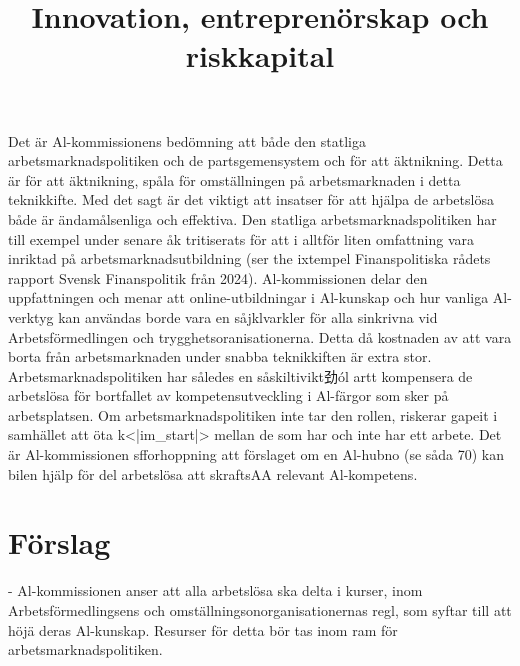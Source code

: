 {{{{{{{{{{{{Det är Al-kommissionens bedömning att både den statliga arbetsmarknadspolitiken och de partsgemensystem och för att äktnikning. Detta är för att äktnikning, spåla för omställningen på arbetsmarknaden i detta teknikkifte. Med det sagt är det viktigt att insatser för att hjälpa de arbetslösa både är ändamålsenliga och effektiva. Den statliga arbetsmarknadspolitiken har till exempel under senare åk tritiserats för att i alltför liten omfattning vara inriktad på arbetsmarknadsutbildning (ser the ixtempel Finanspolitiska rådets rapport Svensk Finanspolitik från 2024). Al-kommissionen delar den uppfattningen och menar att online-utbildningar i Al-kunskap och hur vanliga Al-verktyg kan användas borde vara en såjklvarkler för alla sinkrivna vid Arbetsförmedlingen och trygghetsoranisationerna. Detta då kostnaden av att vara borta från arbetsmarknaden under snabba teknikkiften är extra stor. Arbetsmarknadspolitiken har således en såskiltivikt劲ól artt kompensera de arbetslösa för bortfallet av kompetensutveckling i Al-färgor som sker på arbetsplatsen. Om arbetsmarknadspolitiken inte tar den rollen, riskerar gapeit i samhället att öta k<|im_start|> mellan de som har och inte har ett arbete. Det är Al-kommissionen sfforhoppning att förslaget om en Al-hubno (se såda 70) kan bilen hjälp för del arbetslösa att skraftsAA relevant Al-kompetens.
\section*{Förslag}
- Al-kommissionen anser att alla arbetslösa ska delta i kurser, inom Arbetsförmedlingsens och omställningsonorganisationernas regl, som syftar till att höjä deras Al-kunskap. Resurser för detta bör tas inom ram för arbetsmarknadspolitiken.

\title{
Innovation, entreprenörskap och riskkapital
}
}}}}}}}}}}}}
